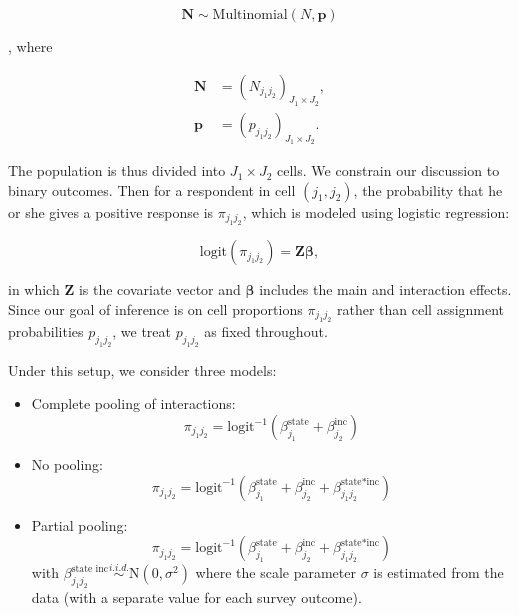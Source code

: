 \documentclass[11pt,article,oneside]{memoir}
\begin{document}
\begin{equation*}\bm{N}\sim \text{Multinomial}(N, \bm{p})\end{equation*}

, where

\begin{align*}
  \bm{N}&=(N_{j_1j_2})_{J_1\times J_2},\\
  \bm{p}&=(p_{j_1j_2})_{J_1\times J_2}.
\end{align*}

\noindent The population is thus divided into \(J_1\times J_2\) cells.
We constrain our discussion to binary outcomes. Then for a respondent in
cell \((j_1, j_2)\), the probability that he or she gives a positive
response is \(\pi_{j_1j_2}\), which is modeled using logistic
regression:

\begin{equation*}
\text{logit}(\pi_{j_1j_2})=\bm Z\bm\beta,
\end{equation*}

\noindent in which \(\bm Z\) is the covariate vector and \(\bm\beta\)
includes the main and interaction effects. Since our goal of inference
is on cell proportions \(\pi_{j_1j_2}\) rather than cell assignment
probabilities \(p_{j_1j_2}\), we treat \(p_{j_1j_2}\) as fixed
throughout.

Under this setup, we consider three models:

\begin{itemize}
\item Complete pooling of interactions:
\begin{equation*}    \pi_{j_1j_2}=\text{logit}^{-1}\left(\beta^{\text{state}}_{j_1}+\beta^{\text{inc}}_{j_2}\right)\end{equation*}
\item
  No pooling:
\begin{equation*}    \pi_{j_1j_2}=\text{logit}^{-1}\left(\beta^{\text{state}}_{j_1}+\beta^{\text{inc}}_{j_2}+\beta^{\text{state*inc}}_{j_1j_2}\right)\end{equation*}

\item
  Partial pooling:
  \begin{equation*}  \pi_{j_1j_2}=\text{logit}^{-1}\left(\beta^{\text{state}}_{j_1}+\beta^{\text{inc}}_{j_2}+\beta^{\text{state*inc}}_{j_1j_2}\right) \end{equation*} with
    $\beta^{\text{state inc}}_{j_1j_2}\stackrel{i.i.d.}{\sim} \mbox{N}(0,\sigma^2)$
   \noindent where the scale parameter $\sigma$ is estimated from the data (with a separate value for each survey outcome).
\end{itemize}
\end{document}
